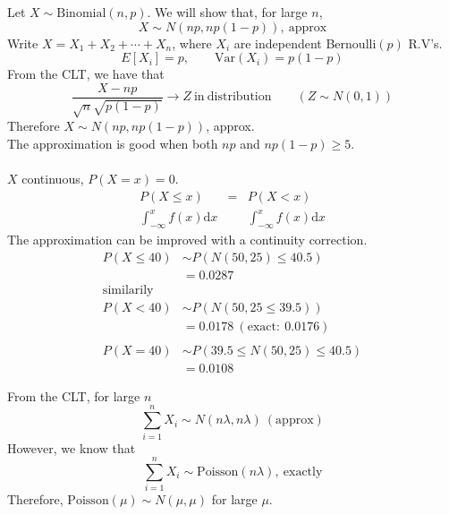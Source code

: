 \documentclass{article}
\let\ddd\cdots
\theoremstyle{definition}
\theoremstyle{remark}
\theoremstyle{example}
\renewcommand{\d}{\mathrm{d}}
\newcommand{\Var}[1]{\mathrm{Var}\left(#1\right)}
\newcommand{\Binomial}[1]{\mathrm{Binomial}\left(#1\right)}
\newcommand{\Poisson}[1]{\mathrm{Poisson}\left(#1\right)}
\begin{document}
	Let $X \sim \Binomial{n,p}$. We will show that, for large $n$, \[X \sim N(np,np(1-p)),\ \mathrm{approx}\]
	Write $X=X_1+X_2+\ddd+X_n$, where $X_i$ are independent Bernoulli$(p)$ R.V's.
	\[E[X_i]=p,\qquad \Var{X_i}=p(1-p)\]
	From the CLT, we have that \[ \frac{X-np}{\sqrt{n}\sqrt{p(1-p)}} \to Z\ \mathrm{in\ distribution}\qquad (Z \sim N(0,1)) \]
	Therefore $X \sim N(np, np(1-p))$, approx.\\
	The approximation is good when both $np$ and $np(1-p) \geq 5$.\\
	\\
	$X$ continuous, $P(X=x)=0$.
	\[\begin{matrix}
		P(X \leq x) & = & P(X < x)\\
		\int_{-\infty}^{x} f(x) \d x & & \int_{-\infty}^{x} f(x) \d x
	\end{matrix}\]
	The approximation can be improved with a continuity correction.
	\begin{align*}
		P(X\leq 40) &\sim P(N(50,25) \leq 40.5)\\
		&=0.0287\\
		\mathrm{similarily}\\
		P(X<40)&\sim P(N(50,25 \leq 39.5))\\
		&= 0.0178\ (\mathrm{exact:}\ 0.0176)\\
		\\
		P(X=40) & \sim P(39.5 \leq N(50,25) \leq 40.5)\\
		&=0.0108
	\end{align*}
	
	From the CLT, for large $n$
	\[\sum_{i=1}^{n}X_i \sim N(n\lambda,n\lambda)\ (\mathrm{approx})\]
	However, we know that \[
		\sum_{i=1}^{n}X_i \sim \Poisson{n\lambda},\ \mathrm{exactly}
	\]
	Therefore, $\Poisson{\mu} \sim N(\mu, \mu )$ for large $\mu$.
	
\end{document}
